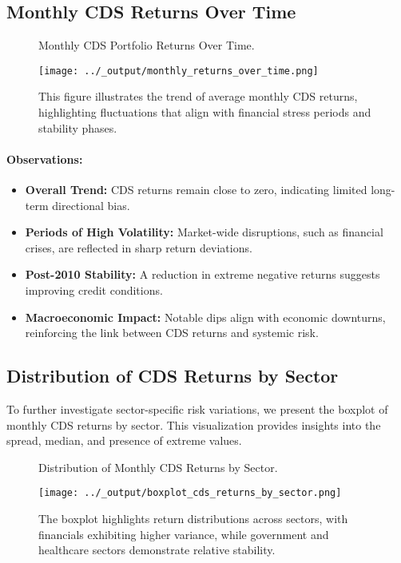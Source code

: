\documentclass{article}
\begin{document}
\subsection{Monthly CDS Returns Over Time}

\begin{figure}[H]
    \centering
    \caption{Monthly CDS Portfolio Returns Over Time. }
    \texttt{[image: ../\_output/monthly\_returns\_over\_time.png]}  
    \caption*{
    This figure illustrates the trend of average monthly CDS returns, highlighting fluctuations that align with financial stress periods and stability phases.}
    \label{fig:monthly_cds_returns}
\end{figure}

\paragraph{Observations:}
\begin{itemize}
    \item \textbf{Overall Trend:} CDS returns remain close to zero, indicating limited long-term directional bias.
    \item \textbf{Periods of High Volatility:} Market-wide disruptions, such as financial crises, are reflected in sharp return deviations.
    \item \textbf{Post-2010 Stability:} A reduction in extreme negative returns suggests improving credit conditions.
    \item \textbf{Macroeconomic Impact:} Notable dips align with economic downturns, reinforcing the link between CDS returns and systemic risk.
\end{itemize}

\subsection{Distribution of CDS Returns by Sector}

To further investigate sector-specific risk variations, we present the boxplot of monthly CDS returns by sector. This visualization provides insights into the spread, median, and presence of extreme values.

\begin{figure}[H]
    \centering
    \caption{Distribution of Monthly CDS Returns by Sector. }
    \texttt{[image: ../\_output/boxplot\_cds\_returns\_by\_sector.png]}
    \caption*{
    The boxplot highlights return distributions across sectors, with financials exhibiting higher variance, while government and healthcare sectors demonstrate relative stability.}
    \label{fig:boxplot_cds_returns}
\end{figure}
\end{document}
